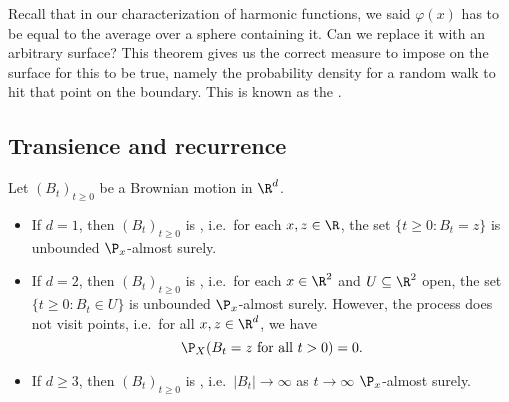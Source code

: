 \documentclass[a4paper]{article}
\begin{document}
Recall that in our characterization of harmonic functions, we said $\varphi(x)$ has to be equal to the average over a sphere containing it. Can we replace it with an arbitrary surface? This theorem gives us the correct measure to impose on the surface for this to be true, namely the probability density for a random walk to hit that point on the boundary. This is known as the .

\subsection{Transience and recurrence}
\begin{thm}
  Let $(B_t)_{t \geq 0}$ be a Brownian motion in $\R^d$.
  \begin{itemize}
    \item If $d = 1$, then $(B_t)_{t \geq 0}$ is , i.e.\ for each $x, z \in \R$, the set $\{t \geq 0: B_t = z\}$ is unbounded $\P_x$-almost surely.
    \item If $d = 2$, then $(B_t)_{t \geq 0}$ is , i.e.\ for each $x \in \R^2$ and $U \subseteq \R^2$ open, the set $\{t \geq 0: B_t \in U\}$ is unbounded $\P_x$-almost surely. However, the process does not visit points, i.e.\ for all $x, z \in \R^d$, we have
      \[
        \P_X(B_t = z\text{ for all }t > 0) = 0.
      \]
    \item If $d \geq 3$, then $(B_t)_{t \geq 0}$ is , i.e.\ $|B_t| \to \infty$ as $t\to \infty$ $\P_x$-almost surely.
  \end{itemize}
\end{thm}
\end{document}
